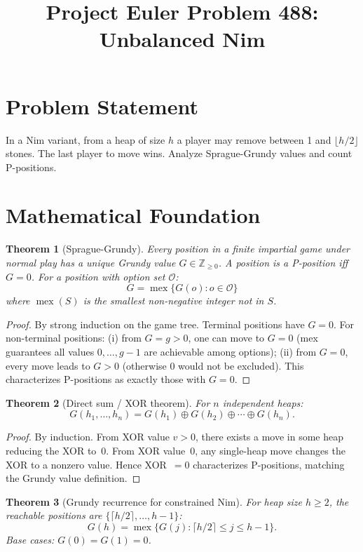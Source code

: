 \documentclass[12pt]{article}
\title{Project Euler Problem 488: Unbalanced Nim}
\author{}
\date{}
\newtheorem{theorem}{Theorem}
\begin{document}
\maketitle

\section{Problem Statement}
In a Nim variant, from a heap of size $h$ a player may remove between 1 and $\lfloor h/2\rfloor$ stones. The last player to move wins. Analyze Sprague-Grundy values and count P-positions.

\section{Mathematical Foundation}

\begin{theorem}[Sprague-Grundy]
Every position in a finite impartial game under normal play has a unique Grundy value $G\in\mathbb{Z}_{\ge 0}$. A position is a P-position iff $G=0$. For a position with option set $\mathcal{O}$:
\[
G = \operatorname{mex}\{G(o) : o\in\mathcal{O}\}
\]
where $\operatorname{mex}(S)$ is the smallest non-negative integer not in $S$.
\end{theorem}

\begin{proof}
By strong induction on the game tree. Terminal positions have $G=0$. For non-terminal positions: (i) from $G=g>0$, one can move to $G=0$ (mex guarantees all values $0,\ldots,g-1$ are achievable among options); (ii) from $G=0$, every move leads to $G>0$ (otherwise $0$ would not be excluded). This characterizes P-positions as exactly those with $G=0$.
\end{proof}

\begin{theorem}[Direct sum / XOR theorem]
For $n$ independent heaps:
\[
G(h_1,\ldots,h_n) = G(h_1)\oplus G(h_2)\oplus\cdots\oplus G(h_n).
\]
\end{theorem}

\begin{proof}
By induction. From XOR value $v>0$, there exists a move in some heap reducing the XOR to~0. From XOR value~0, any single-heap move changes the XOR to a nonzero value. Hence XOR~$=0$ characterizes P-positions, matching the Grundy value definition.
\end{proof}

\begin{theorem}[Grundy recurrence for constrained Nim]
For heap size $h\ge 2$, the reachable positions are $\{\lceil h/2\rceil,\ldots,h-1\}$:
\[
G(h) = \operatorname{mex}\bigl\{G(j):\lceil h/2\rceil\le j\le h-1\bigr\}.
\]
Base cases: $G(0)=G(1)=0$.
\end{theorem}
\end{document}
